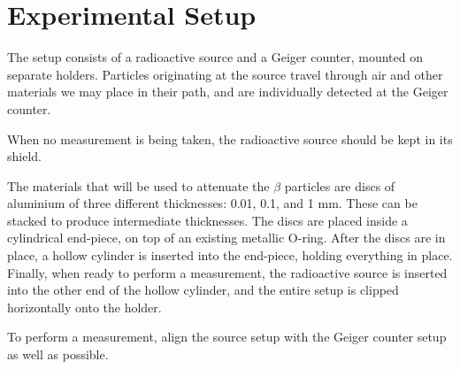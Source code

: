 \section{Experimental Setup}

The setup consists of a radioactive source and a Geiger counter, mounted on separate holders. Particles originating at the source travel through air and other materials we may place in their path, and are individually detected at the Geiger counter.

When no measurement is being taken, the radioactive source should be kept in its shield.

The materials that will be used to attenuate the $\beta$ particles are discs of aluminium of three different thicknesses: 0.01, 0.1, and 1 mm. These can be stacked to produce intermediate thicknesses. The discs are placed inside a cylindrical end-piece, on top of an existing metallic O-ring. After the discs are in place, a hollow cylinder is inserted into the end-piece, holding everything in place. Finally, when ready to perform a measurement, the radioactive source is inserted into the other end of the hollow cylinder, and the entire setup is clipped horizontally onto the holder.

To perform a measurement, align the source setup with the Geiger counter setup as well as possible.